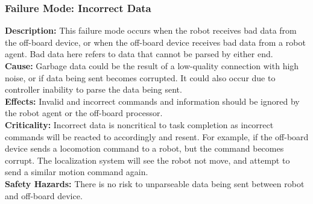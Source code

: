 \subsubsection{Failure Mode: Incorrect Data}
\label{sec:comm_fm_incorrect}
\textbf{Description:} This failure mode occurs when the robot receives bad data from the off-board device, or when the off-board device receives bad data from a robot agent. Bad data here refers to data that cannot be parsed by either end. \\
\textbf{Cause:} Garbage data could be the result of a low-quality connection with high noise, or if data being sent becomes corrupted. It could also occur due to controller inability to parse the data being sent. \\
\textbf{Effects:} Invalid and incorrect commands and information should be ignored by the robot agent or the off-board processor. \\
\textbf{Criticality:} Incorrect data is noncritical to task completion as incorrect commands will be reacted to accordingly and resent. For example, if the off-board device sends a locomotion command to a robot, but the command becomes corrupt. The localization system will see the robot not move, and attempt to send a similar motion command again. \\
\textbf{Safety Hazards:} There is no risk to unparseable data being sent between robot and off-board device.
